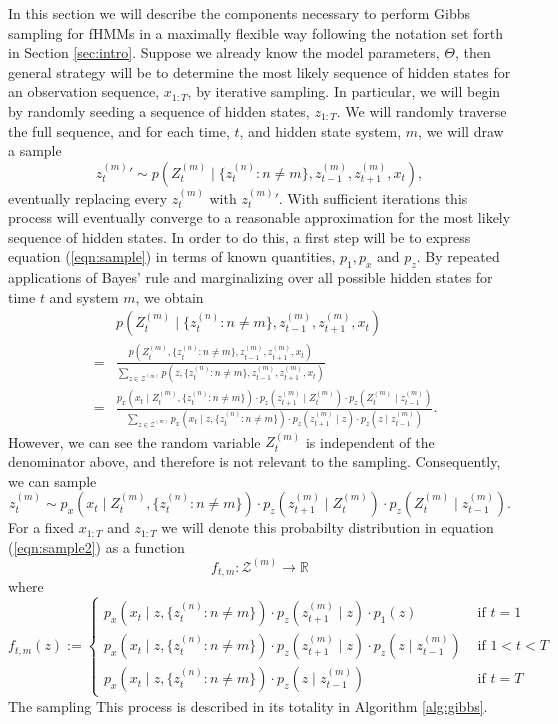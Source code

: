 \documentclass{amsart}
\begin{document}
In this section we will describe the components necessary to perform Gibbs 
sampling for fHMMs in a maximally flexible way following the notation set forth 
in Section \ref{sec:intro}.  Suppose we already know the model parameters, 
$\Theta$, then general strategy will be to determine the most 
likely sequence of hidden states for an observation sequence, $x_{1:T}$, by iterative 
sampling.  In particular, we will begin by randomly seeding a sequence of hidden 
states, $z_{1:T}$.  We will randomly traverse the full sequence, and for each time, 
$t$, and hidden state system, $m$, we will draw a sample  
\begin{equation}\label{eqn:sample}
{z_t^{(m)}}'\sim p(Z_t^{(m)}\mid \{z_t^{(n)}:n\neq m\},z_{t-1}^{(m)}, z_{t+1}^{(m)}, x_t),
\end{equation}
eventually replacing every $z_t^{(m)}$ with ${z_t^{(m)}}'$.  With sufficient 
iterations this process will eventually converge to a reasonable approximation 
for the most likely sequence of hidden states.  In order to do this, a first 
step will be to express equation (\ref{eqn:sample}) in terms of known 
quantities, $p_1,p_x$ and $p_z$.  By repeated applications of Bayes' rule and marginalizing over all possible hidden 
states for time $t$ and system $m$, we obtain 
\begin{eqnarray*}
&&p(Z_t^{(m)}\mid \{z_t^{(n)}:n\neq m\},z_{t-1}^{(m)}, z_{t+1}^{(m)}, x_t)\\
& = & \frac{
p(Z_t^{(m)},\{z_t^{(n)}:n\neq m\},z_{t-1}^{(m)}, z_{t+1}^{(m)}, x_t)
}{
\sum_{z\in \mathcal Z^{(m)}}p(z,\{z_t^{(n)}:n\neq m\},z_{t-1}^{(m)}, 
z_{t+1}^{(m)}, x_t)
}\\
& = & \frac{
p_x(x_t\mid Z_t^{(m)},\{z_t^{(n)}:n\neq m\})\cdot
p_z(z_{t+1}^{(m)}\mid Z_t^{(m)})\cdot
p_z(Z_t^{(m)}\mid z_{t-1}^{(m)})
}{
\sum_{z\in \mathcal Z^{(m)}}
p_x(x_t\mid z,\{z_t^{(n)}:n\neq m\})\cdot
p_z(z_{t+1}^{(m)}\mid z)\cdot
p_z(z\mid z_{t-1}^{(m)})
}.
\end{eqnarray*}
However, we can see the random variable $Z_t^{(m)}$ is independent of the 
denominator above, and therefore is not 
relevant to the sampling. Consequently, we can sample 
\begin{equation}\label{eqn:sample2}
z_t^{(m)}\sim p_x(x_t\mid Z_t^{(m)},\{z_t^{(n)}:n\neq m\})\cdot
p_z(z_{t+1}^{(m)}\mid Z_t^{(m)})\cdot
p_z(Z_t^{(m)}\mid z_{t-1}^{(m)}).
\end{equation}
For a fixed $x_{1:T}$ and $z_{1:T}$ we will denote this probabilty distribution 
in equation (\ref{eqn:sample2}) as a function 
\[
f_{t,m}:\mathcal Z^{(m)}\rightarrow \mathbb{R}
\]
where 
\[
f_{t,m}(z) := \begin{cases}
p_x(x_t\mid z,\{z_t^{(n)}:n\neq m\})\cdot
p_z(z_{t+1}^{(m)}\mid z)\cdot
p_1(z)& \text{ if }t=1\\
p_x(x_t\mid z,\{z_t^{(n)}:n\neq m\})\cdot
p_z(z_{t+1}^{(m)}\mid z)\cdot
p_z(z\mid z_{t-1}^{(m)})& \text{ if }1<t<T\\
p_x(x_t\mid z,\{z_t^{(n)}:n\neq m\})\cdot
p_z(z\mid z_{t-1}^{(m)})& \text{ if }t=T
\end{cases}
\]
The sampling This process is described in its totality in Algorithm \ref{alg:gibbs}.  
\end{document}
